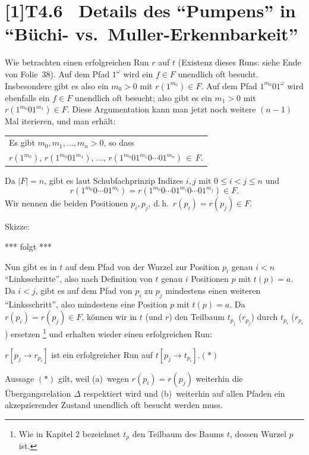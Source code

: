 \documentclass[fontsize=11pt, twoside=false, numbers=autoenddot]{scrbook}
\begin{document}
\section*{\scalebox{.96}[1]{T4.6~ Details des "`Pumpens"' in "`Büchi- vs.\ Muller-Erkennbarkeit"'}}

Wie betrachten einen erfolgreichen Run $r$ auf $t$ (Existenz dieses Runs: siehe Ende von Folie~38).
Auf dem Pfad $1^\omega$ wird ein $f \in F$ unendlich oft besucht.
Insbesondere gibt es also ein $m_0 > 0$ mit $r(1^{m_0}) \in F$.
Auf dem Pfad $1^{m_0}01^\omega$ wird ebenfalls ein $f \in F$ unendlich oft besucht;
also gibt es ein $m_1 > 0$ mit $r(1^{m_0}01^{m_1}) \in F$.
Diese Argumentation kann man jetzt noch weitere $(n-1)$ Mal iterieren,
und man erhält:
%
\begin{center}
  \begin{tabular}{@{}l@{}}
    Es gibt $m_0,m_1,\dots,m_n > 0$, so dass\\[2pt]
    $r(1^{m_0}),\, r(1^{m_0}01^{m_1}),\, \dots,\, r(1^{m_0}01^{m_1}0\cdots01^{m_n}) \,\in\, F$.
  \end{tabular}
\end{center}
%
Da $|F|=n$, gibt es laut Schubfachprinzip Indizes $i,j$ mit $0 \leq i < j \leq n$
und
\[
  r(1^{m_0}0\cdots01^{m_i}) = r(1^{m_0}0\cdots01^{m_i}0\cdots01^{m_j}) \in F.
\]
Wir nennen die beiden Positionen $p_i,p_j$, d.\,h.\ $r(p_i) = r(p_j) \in F$.

\par\smallskip
Skizze:
%
\begin{center}
  *** folgt ***
\end{center}
%
Nun gibt es in $t$ auf dem Pfad von der Wurzel zur Position $p_i$ genau $i < n$
"`Linksschritte"', also nach Definition von $t$ genau $i$ Positionen $p$ mit $t(p) = a$.
Da $i < j$, gibt es auf dem Pfad von $p_i$ zu $p_j$ mindestens einen weiteren
"`Linksschritt"', also mindestens eine Position $p$ mit $t(p)=a$.
Da $r(p_i)=r(p_j) \in F$,
können wir in $t$ (und $r$) den Teilbaum $t_{p_j}$ ($r_{p_j}$)
durch $t_{p_i}$ ($r_{p_i}$) ersetzen%
\footnote{%
  Wie in Kapitel 2 bezeichnet $t_p$ den Teilbaum des Baums $t$,
  dessen Wurzel $p$ ist.
}
und erhalten wieder einen erfolgreichen Run:
%
\begin{center}
  $r[p_j \to r_{p_i}]$ ist ein erfolgreicher Run auf $t[p_j \to t_{p_i}]$.\qquad $(*)$
\end{center}
%
Aussage $(*)$ gilt, weil
(a)~wegen $r(p_i)=r(p_j)$ weiterhin die Übergangsrelation $\Delta$ respektiert wird und
(b)~weiterhin auf allen Pfaden ein akzepzierender Zustand unendlich oft besucht werden muss.
\end{document}
